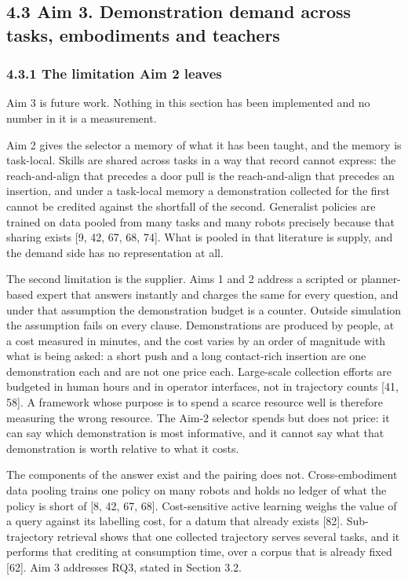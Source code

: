 \documentclass[
  11pt,
]{article}
\begin{document}
\hypertarget{aim-3.-demonstration-demand-across-tasks-embodiments-and-teachers}{%
\subsection{4.3 Aim 3. Demonstration demand across tasks, embodiments
and
teachers}\label{aim-3.-demonstration-demand-across-tasks-embodiments-and-teachers}}

\hypertarget{the-limitation-aim-2-leaves}{%
\subsubsection{4.3.1 The limitation Aim 2
leaves}\label{the-limitation-aim-2-leaves}}

Aim 3 is future work. Nothing in this section has been implemented and
no number in it is a measurement.

Aim 2 gives the selector a memory of what it has been taught, and the
memory is task-local. Skills are shared across tasks in a way that
record cannot express: the reach-and-align that precedes a door pull is
the reach-and-align that precedes an insertion, and under a task-local
memory a demonstration collected for the first cannot be credited
against the shortfall of the second. Generalist policies are trained on
data pooled from many tasks and many robots precisely because that
sharing exists {[}9, 42, 67, 68, 74{]}. What is pooled in that
literature is supply, and the demand side has no representation at all.

The second limitation is the supplier. Aims 1 and 2 address a scripted
or planner-based expert that answers instantly and charges the same for
every question, and under that assumption the demonstration budget is a
counter. Outside simulation the assumption fails on every clause.
Demonstrations are produced by people, at a cost measured in minutes,
and the cost varies by an order of magnitude with what is being asked: a
short push and a long contact-rich insertion are one demonstration each
and are not one price each. Large-scale collection efforts are budgeted
in human hours and in operator interfaces, not in trajectory counts
{[}41, 58{]}. A framework whose purpose is to spend a scarce resource
well is therefore measuring the wrong resource. The Aim-2 selector
spends but does not price: it can say which demonstration is most
informative, and it cannot say what that demonstration is worth relative
to what it costs.

The components of the answer exist and the pairing does not.
Cross-embodiment data pooling trains one policy on many robots and holds
no ledger of what the policy is short of {[}8, 42, 67, 68{]}.
Cost-sensitive active learning weighs the value of a query against its
labelling cost, for a datum that already exists {[}82{]}. Sub-trajectory
retrieval shows that one collected trajectory serves several tasks, and
it performs that crediting at consumption time, over a corpus that is
already fixed {[}62{]}. Aim 3 addresses RQ3, stated in Section 3.2.
\end{document}

